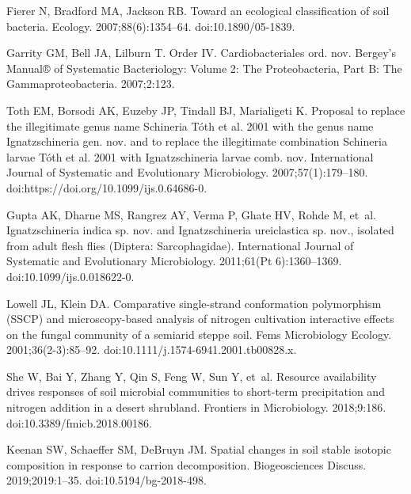 \documentclass[
  10pt,
  letterpaper,
]{article}
\begin{document}
\begin{thebibliography}{10}
  Fierer N, Bradford MA, Jackson RB.
  \newblock Toward an ecological classification of soil bacteria.
  \newblock Ecology. 2007;88(6):1354--64.
  \newblock doi:{10.1890/05-1839}.
  
  Garrity GM, Bell JA, Lilburn T.
  \newblock Order {IV}. {Cardiobacteriales} ord. nov.
  \newblock Bergey's Manual® of Systematic Bacteriology: Volume 2: The
    Proteobacteria, Part B: The Gammaproteobacteria. 2007;2:123.
  
  Toth EM, Borsodi AK, Euzeby JP, Tindall BJ, Marialigeti K.
  \newblock Proposal to replace the illegitimate genus name {Schineria} {Tóth}
    et al. 2001 with the genus name {Ignatzschineria} gen. nov. and to replace
    the illegitimate combination {Schineria} larvae {Tóth} et al. 2001 with
    {Ignatzschineria} larvae comb. nov.
  \newblock International Journal of Systematic and Evolutionary Microbiology.
    2007;57(1):179--180.
  \newblock doi:{https://doi.org/10.1099/ijs.0.64686-0}.
  
  Gupta AK, Dharne MS, Rangrez AY, Verma P, Ghate HV, Rohde M, et~al.
  \newblock Ignatzschineria indica sp. nov. and {Ignatzschineria} ureiclastica
    sp. nov., isolated from adult flesh flies ({Diptera}: {Sarcophagidae}).
  \newblock International Journal of Systematic and Evolutionary Microbiology.
    2011;61(Pt 6):1360--1369.
  \newblock doi:{10.1099/ijs.0.018622-0}.
  
  Lowell JL, Klein DA.
  \newblock Comparative single-strand conformation polymorphism ({SSCP}) and
    microscopy-based analysis of nitrogen cultivation interactive effects on the
    fungal community of a semiarid steppe soil.
  \newblock Fems Microbiology Ecology. 2001;36(2-3):85--92.
  \newblock doi:{10.1111/j.1574-6941.2001.tb00828.x}.
  
  She W, Bai Y, Zhang Y, Qin S, Feng W, Sun Y, et~al.
  \newblock Resource availability drives responses of soil microbial communities
    to short-term precipitation and nitrogen addition in a desert shrubland.
  \newblock Frontiers in Microbiology. 2018;9:186.
  \newblock doi:{10.3389/fmicb.2018.00186}.
  
  Keenan SW, Schaeffer SM, DeBruyn JM.
  \newblock Spatial changes in soil stable isotopic composition in response to
    carrion decomposition.
  \newblock Biogeosciences Discuss. 2019;2019:1--35.
  \newblock doi:{10.5194/bg-2018-498}.
  

\end{thebibliography}
\end{document}
